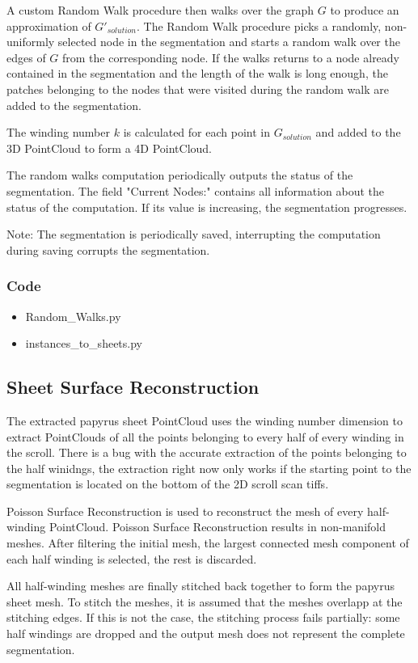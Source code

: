 \documentclass[peerreview]{IEEEtran}
\begin{document}
A custom Random Walk procedure then walks over the graph \(G\) to produce an approximation of \(G'_{solution}\).
The Random Walk procedure picks a randomly, non-uniformly selected node in the segmentation and starts a random walk over the edges of $G$ from the corresponding node. If the walks returns to a node already contained in the segmentation and the length of the walk is long enough, the patches belonging to the nodes that were visited during the random walk are added to the segmentation.

The winding number $k$ is calculated for each point in $G_{solution}$ and added to the 3D PointCloud to form a 4D PointCloud. 

The random walks computation periodically outputs the status of the segmentation. The field "Current Nodes:" contains all information about the status of the computation. If its value is increasing, the segmentation progresses.

Note: The segmentation is periodically saved, interrupting the computation during saving corrupts the segmentation.

\subsubsection{Code}
\begin{itemize}
    \item Random\_Walks.py
    \item instances\_to\_sheets.py
\end{itemize}


\subsection{Sheet Surface Reconstruction}
The extracted papyrus sheet PointCloud uses the winding number dimension to extract PointClouds of all the points belonging to every half of every winding in the scroll. There is a bug with the accurate extraction of the points belonging to the half winidngs, the extraction right now only works if the starting point to the segmentation is located on the bottom of the 2D scroll scan tiffs.

Poisson Surface Reconstruction is used to reconstruct the mesh of every half-winding PointCloud. 
Poisson Surface Reconstruction results in non-manifold meshes. After filtering the initial mesh, the largest connected mesh component of each half winding is selected, the rest is discarded.

All half-winding meshes are finally stitched back together to form the papyrus sheet mesh. To stitch the meshes, it is assumed that the meshes overlapp at the stitching edges. If this is not the case, the stitching process fails partially: some half windings are dropped and the output mesh does not represent the complete segmentation.
\end{document}
